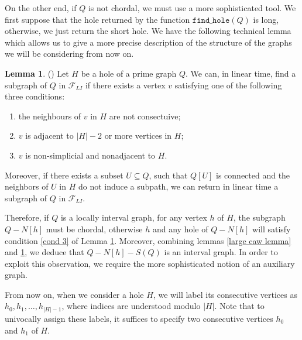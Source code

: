 \documentclass{article}
\theoremstyle{definition}
\newtheorem{lemma}[thm]{Lemma}
\begin{document}
    On the other end,
    if $Q$ is not
    chordal, we must use a
    more sophisticated tool.
    We first suppose that 
    the hole returned by
    the function $\texttt{find\_hole}\left(Q\right)$ 
    is long, otherwise,
    we just return the
    short hole.
    We have the following
    technical lemma which 
    allows us to give 
    a more precise description 
    of the structure
    of the graphs we will
    be considering from now on.
    
    \begin{lemma} (\cite{main}) \label{fund lemma}
        Let $H$ be a hole
        of a prime graph $Q$.
        We can, in linear time,
        find a subgraph of $Q$
        in $\mathcal{F}_{LI}$
        if there exists a vertex $v$ 
        satisfying one of the
        following three
        conditions:
        \begin{enumerate}
            \item the neighbours
                of $v$ in $H$ 
                are not consectuive;
            \item $v$ is adjacent
                to $\left|H\right| - 2$ 
                or more vertices in $H$;
            \item $v$ is non-simplicial and nonadjacent
               to $H$. \label{cond 3}
        \end{enumerate}
        Moreover, if there exists
        a subset $U \subseteq Q$, 
        such that $Q\left[U\right]$ 
        is connected and the
        neighbors of $U$ in
        $H$ do not induce
        a subpath, we can 
        return in linear
        time a subgraph of $Q$ 
        in $\mathcal{F}_{LI}$.
    \end{lemma}
    
    Therefore, if $Q$ is a
    locally interval graph,
    for any vertex $h$ of $H$, 
    the subgraph $Q - N\left[h\right]$ 
    must be chordal, otherwise
    $h$ and any hole of $Q - N\left[h\right]$
    will satisfy condition \ref{cond 3}
    of Lemma \ref{fund lemma}.
    Moreover, combining lemmas
    \ref{large caw lemma} 
    and \ref{fund lemma},
    we deduce that $Q - N\left[h\right] - S\left(Q\right)$ 
    is an interval graph.
    In order to exploit
    this observation,
    we require the more 
    sophisticated notion
    of an auxiliary graph.

    From now on, when we
    consider a hole $H$, 
    we will label its consecutive
    vertices as $h_{0}, h_{1}, \ldots, h_{\left|H\right|-1}$,
    where indices are understood modulo
    $\left|H\right|$. Note that to univocally 
    assign these labels, it suffices to
    specify two consecutive 
    vertices $h_0$ and $h_1$
    of $H$.
    
\end{document}
